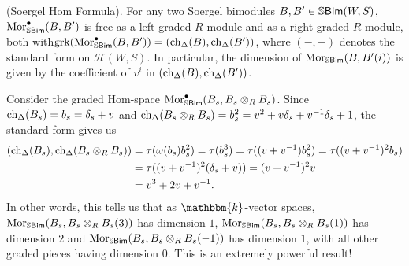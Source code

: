 \noindent\begin{theorem}\textup{(Soergel Hom Formula).}\label{SoergelHom} For any two Soergel bimodules $B, B' \in \mathbb{S}\textup{\textsf{Bim}}(W, S)$, %
$\textup{Mor}^\bullet_{\mathbb{S}\textup{\textsf{Bim}}}(B, B')$ %
is free as a left graded $R$-module and as a right graded $R$-module, both with\linebreak $\textup{grk}(\textup{Mor}^\bullet_{\mathbb{S}\textup{\textsf{Bim}}}(B, B')) = (\textup{ch}_\Delta(B), \textup{ch}_\Delta(B'))$, where $(-, -)$ denotes the standard form on $\mathscr{H}(W, S)$. In particular, the dimension of $\textup{Mor}_{\mathbb{S}\textup{\textsf{Bim}}}(B, B'(i))$ is given by the coefficient of $v^i$ in $(\textup{ch}_\Delta(B), \textup{ch}_\Delta(B'))$.\newpage
\end{theorem}

\noindent\begin{example} Consider the graded Hom-space $\textup{Mor}^\bullet_{\mathbb{S}\textup{\textsf{Bim}}}(B_s, B_s \otimes_R B_s)$. Since $\textup{ch}_\Delta(B_s) = b_s = \delta_s + v$ and $\textup{ch}_\Delta(B_s \otimes_R B_s) = b_s^2 = v^2 + v\delta_s + v^{-1}\delta_s + 1$, the standard form gives us
\begin{align*}
\begin{split}
(\textup{ch}_\Delta(B_s), \textup{ch}_\Delta(B_s \otimes_R B_s)) &= \tau(\omega(b_s)b_s^2) = \tau(b_s^3) = \tau((v + v^{-1})b_s^2) = \tau((v + v^{-1})^2b_s)\\
&= \tau((v + v^{-1})^2(\delta_s + v)) = (v + v^{-1})^2v\\
&= v^3 + 2v + v^{-1}.
\end{split}
\end{align*}
\noindent In other words, this tells us that as $\mathbbm{k}$-vector spaces, $\textup{Mor}_{\mathbb{S}\textup{\textsf{Bim}}}(B_s, B_s \otimes_R B_s(3))$ has dimension $1$, $\textup{Mor}_{\mathbb{S}\textup{\textsf{Bim}}}(B_s, B_s \otimes_R B_s(1))$ has dimension $2$ and $\textup{Mor}_{\mathbb{S}\textup{\textsf{Bim}}}(B_s, B_s \otimes_R B_s(-1))$ has dimension $1$, with all other graded pieces having dimension $0$. This is an extremely powerful result!\\
\end{example}


